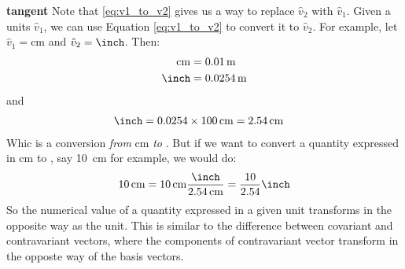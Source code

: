 \documentclass[letterpaper,10pt]{article}
\begin{document}
\textbf{tangent}
Note that \ref{eq:v1_to_v2} gives us a way to replace $\hat{v}_2$ with
$\hat{v}_1$. Given a units $\hat{v}_1$, we can use Equation \ref{eq:v1_to_v2}
to convert it to $\hat{v}_2$. For example, let $\hat{v}_1 = \si{\centi\meter}$ and $\hat{v}_2 = \si{\inch}$.
Then:
\begin{align}
  \si{\centi\meter} &= \SI{0.01}{\meter} \\
  \si{\inch} &= \SI{0.0254}{\meter} 
\end{align}
and
\begin{align}
  \si{\inch} &= 0.0254\times \SI{100}{\centi\meter}  = \SI{2.54}{\centi\meter}
\end{align}
Whic is a conversion \emph{from} \si{\centi\meter} \emph{to} \si{\inch}. But if we want to convert a quantity expressed in \si{\centi\meter}
to \si{\inch}, say \SI{10}{\centi\meter} for example, we would do:
\begin{align}
  \SI{10}{\centi\meter} = \SI{10}{\centi\meter} \frac{\si{\inch}}{\SI{2.54}{\centi\meter}} = \frac{10}{2.54} \si{\inch}
\end{align}
So the numerical value of a quantity expressed in a given unit transforms in the opposite way as the unit. This is similar to the difference
between covariant and contravariant vectors, where the components of contravariant vector transform in the opposte way of the basis vectors.
\end{document}
